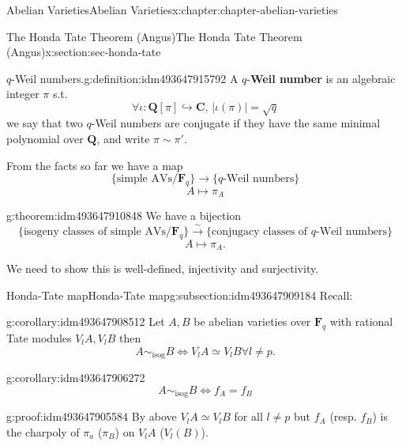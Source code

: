 \documentclass[oneside,10pt,]{book}
\newcommand{\terminology}[1]{\textbf{#1}}
\numberwithin{equation}{section}
\newcommand{\lb}{[}
\newcommand{\rb}{]}
\newcommand{\QQ}{\mathbf{Q}}
\newcommand{\CC}{\mathbf{C}}
\newcommand{\FF}{\mathbf{F}}
\begin{document}
\begin{chapterptx}{Abelian Varieties}{}{Abelian Varieties}{}{}{x:chapter:chapter-abelian-varieties}
\begin{sectionptx}{The Honda Tate Theorem (Angus)}{}{The Honda Tate Theorem (Angus)}{}{}{x:section:sec-honda-tate}
\begin{introduction}{}
\begin{definition}{\(q\)-Weil numbers.}{g:definition:idm493647915792}
A \(q\)-\terminology{Weil number} is an algebraic integer \(\pi\) s.t.%
\begin{equation*}
\forall \iota \colon \QQ\lb \pi\rb \hookrightarrow \CC,\,|\iota(\pi)| = \sqrt q
\end{equation*}
we say that two \(q\)-Weil numbers are conjugate if they have the same minimal polynomial over \(\QQ\), and write \(\pi \sim \pi'\).%
\end{definition}
From the facts so far we have a map%
\begin{equation*}
\{\text{simple AVs}/\FF_q\}\to \{q\text{-Weil numbers}\}
\end{equation*}
%
\begin{equation*}
A \mapsto \pi_A
\end{equation*}
%
\begin{theorem}{}{}{g:theorem:idm493647910848}%
We have a bijection%
\begin{equation*}
\{\text{isogeny classes of simple AVs}/\FF_q\}\xrightarrow{\sim} \{\text{conjugacy classes of }q\text{-Weil numbers}\}
\end{equation*}
%
\begin{equation*}
A \mapsto \pi_A\text{.}
\end{equation*}
%
\end{theorem}
We need to show this is well-defined, injectivity and surjectivity.%
\end{introduction}%
%
%
\typeout{************************************************}
\typeout{************************************************}
%
\begin{subsectionptx}{Honda-Tate map}{}{Honda-Tate map}{}{}{g:subsection:idm493647909184}
Recall:%
\begin{corollary}{}{}{g:corollary:idm493647908512}%
Let \(A,B\) be abelian varieties over \(\FF_q\) with rational Tate modules \(V_l A, V_lB\) then%
\begin{equation*}
A\sim_{\text{isog}} B \iff V_l A \simeq V_l B \forall l \ne p\text{.}
\end{equation*}
%
\end{corollary}
\begin{corollary}{}{}{g:corollary:idm493647906272}%
%
\begin{equation*}
A\sim_{\text{isog}} B \iff f_A = f_B
\end{equation*}
%
\end{corollary}
\begin{proofptx}{}{g:proof:idm493647905584}
By above \(V_l A \simeq V_lB\) for all \(l \ne p\) but \(f_A\) (resp. \(f_B\)) is the charpoly of \(\pi_a\) (\(\pi_B\)) on \(V_l A\) (\(V_l(B)\)).%

\end{proofptx}
\end{subsectionptx}
\end{sectionptx}
\end{chapterptx}
\end{document}
